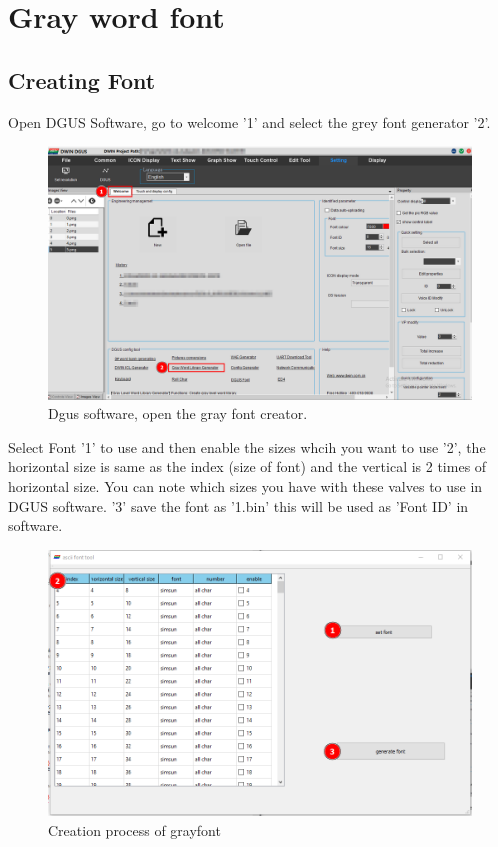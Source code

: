 \documentclass[12pt, A4]{article} %
\begin{document}
\section{Gray word font}
\subsection{Creating Font}
Open DGUS Software, go to welcome '1' and select the grey font generator '2'.
\begin{figure}[!htb] %
	\centering
	\includegraphics[width=14cm]{grayFont1} 
	\caption{Dgus software, open the gray font creator.}
\end{figure}
Select Font '1' to use and then enable the sizes whcih you want to use '2', the horizontal size is same as the index (size of font) and the vertical is 2 times of horizontal size. You can note which sizes you have with these valves to use in DGUS software. '3' save the font as '1.bin' this will be used as 'Font ID' in software.
\begin{figure}[!htb] %
	\centering
	\includegraphics[width=14cm]{grayFont2} 
	\caption{Creation process of grayfont}
\end{figure}
\end{document}
